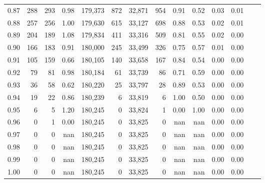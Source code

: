 \begin{tabular}{rrrrrrrrrrrrrr}
0.87 &    288 &  293 &    0.98 &  179,373 &      872 &  32,871 &     954 &  0.91 &  0.52 &  0.03 &      0.01 \\
0.88 &    257 &  256 &    1.00 &  179,630 &      615 &  33,127 &     698 &  0.88 &  0.53 &  0.02 &      0.01 \\
0.89 &    204 &  189 &    1.08 &  179,834 &      411 &  33,316 &     509 &  0.81 &  0.55 &  0.02 &      0.00 \\
0.90 &    166 &  183 &    0.91 &  180,000 &      245 &  33,499 &     326 &  0.75 &  0.57 &  0.01 &      0.00 \\
0.91 &    105 &  159 &    0.66 &  180,105 &      140 &  33,658 &     167 &  0.84 &  0.54 &  0.00 &      0.00 \\
0.92 &     79 &   81 &    0.98 &  180,184 &       61 &  33,739 &      86 &  0.71 &  0.59 &  0.00 &      0.00 \\
0.93 &     36 &   58 &    0.62 &  180,220 &       25 &  33,797 &      28 &  0.89 &  0.53 &  0.00 &      0.00 \\
0.94 &     19 &   22 &    0.86 &  180,239 &        6 &  33,819 &       6 &  1.00 &  0.50 &  0.00 &      0.00 \\
0.95 &      6 &    5 &    1.20 &  180,245 &        0 &  33,824 &       1 &  0.00 &  1.00 &  0.00 &      0.00 \\
0.96 &      0 &    1 &    0.00 &  180,245 &        0 &  33,825 &       0 &   nan &   nan &  0.00 &      0.00 \\
0.97 &      0 &    0 &     nan &  180,245 &        0 &  33,825 &       0 &   nan &   nan &  0.00 &      0.00 \\
0.98 &      0 &    0 &     nan &  180,245 &        0 &  33,825 &       0 &   nan &   nan &  0.00 &      0.00 \\
0.99 &      0 &    0 &     nan &  180,245 &        0 &  33,825 &       0 &   nan &   nan &  0.00 &      0.00 \\
1.00 &      0 &    0 &     nan &  180,245 &        0 &  33,825 &       0 &   nan &   nan &  0.00 &      0.00 \\
\bottomrule
\end{tabular}

